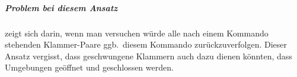 \subparagraph{Problem bei diesem Ansatz} zeigt sich darin, wenn man versuchen würde alle nach einem Kommando stehenden Klammer-Paare ggb.\ diesem Kommando zurückzuverfolgen. Dieser Ansatz vergisst, dass geschwungene Klammern auch dazu dienen könnten, dass Umgebungen geöffnet und geschlossen werden.


\begin{comment}
    Möglich ist alles:
        \command(([t] OR {t}) AND ([n] OR {t}) AND ([t] OR {n}) AND ([n] OR {n}))^9
            -> Aus Def's und Newcommand
            -> 9 Felder mit je 2*2=4 Optionen --> 4^9 Permutationen alleine hier (ca. 250 Tausend // 4^9 = 2^2^9 = 2^18 = 2^20 / 4 \approx 10^6 / 4)
        \objectForCommandClass{
            key_1 = t or n,
            key_2 = t or n,
            ...
            key_alpha = t or n
        }
            -> Theoretically infinite, given infinite runtime?
            -> Actual limit to be tested in own implementation?
\end{comment}


